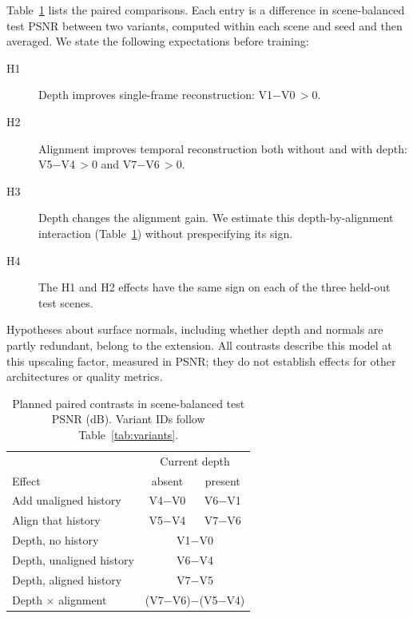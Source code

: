 \documentclass[11pt,a4paper]{article}
\begin{document}
Table~\ref{tab:contrasts} lists the paired comparisons. Each entry is a
difference in scene-balanced test PSNR between two variants, computed
within each scene and seed and then averaged. We state the following
expectations before training:
\begin{description}
\item[H1] Depth improves single-frame reconstruction: V1$-$V0$\,>0$.
\item[H2] Alignment improves temporal reconstruction both without and
with depth: V5$-$V4$\,>0$ and V7$-$V6$\,>0$.
\item[H3] Depth changes the alignment gain. We estimate this
depth-by-alignment interaction (Table~\ref{tab:contrasts}) without
prespecifying its sign.
\item[H4] The H1 and H2 effects have the same sign on each of the three
held-out test scenes.
\end{description}
Hypotheses about surface normals, including whether depth and normals
are partly redundant, belong to the extension. All contrasts describe
this model at this upscaling factor, measured in PSNR; they do not
establish effects for other architectures or quality metrics.

\begin{table}[tb]
\centering
\caption{Planned paired contrasts in scene-balanced test PSNR (dB).
Variant IDs follow Table~\ref{tab:variants}.}
\label{tab:contrasts}
\small
\setlength{\tabcolsep}{4pt}
\begin{tabular}{@{}lcc@{}}
\hline
 & \multicolumn{2}{c}{Current depth} \\
Effect & absent & present \\
\hline
Add unaligned history & V4$-$V0 & V6$-$V1 \\
Align that history    & V5$-$V4 & V7$-$V6 \\
\hline
Depth, no history        & \multicolumn{2}{c}{V1$-$V0} \\
Depth, unaligned history & \multicolumn{2}{c}{V6$-$V4} \\
Depth, aligned history   & \multicolumn{2}{c}{V7$-$V5} \\
Depth $\times$ alignment & \multicolumn{2}{c}{(V7$-$V6)$-$(V5$-$V4)} \\
\hline
\end{tabular}
\end{table}
\end{document}
